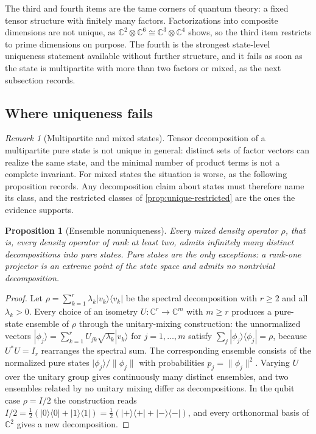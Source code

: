 \documentclass[11pt,letterpaper]{article}
\newtheorem{proposition}[theorem]{Proposition}
\theoremstyle{definition}
\theoremstyle{remark}
\newtheorem{remark}[theorem]{Remark}
\begin{document}
The third and fourth items are the tame corners of quantum theory: a fixed tensor structure with finitely many factors. Factorizations into composite dimensions are not unique, as $\mathbb{C}^2 \otimes \mathbb{C}^6 \cong \mathbb{C}^3 \otimes \mathbb{C}^4$ shows, so the third item restricts to prime dimensions on purpose. The fourth is the strongest state-level uniqueness statement available without further structure, and it fails as soon as the state is multipartite with more than two factors or mixed, as the next subsection records.

\subsection{Where uniqueness fails}

\begin{remark}[Multipartite and mixed states]
Tensor decomposition of a multipartite pure state is not unique in general: distinct sets of factor vectors can realize the same state, and the minimal number of product terms is not a complete invariant. For mixed states the situation is worse, as the following proposition records. Any decomposition claim about states must therefore name its class, and the restricted classes of \cref{prop:unique-restricted} are the ones the evidence supports.
\end{remark}

\begin{proposition}[Ensemble nonuniqueness]
\label{prop:ensemble}
Every mixed density operator $\rho$, that is, every density operator of rank at least two, admits infinitely many distinct decompositions into pure states. Pure states are the only exceptions: a rank-one projector is an extreme point of the state space and admits no nontrivial decomposition.
\end{proposition}

\begin{proof}
Let $\rho = \sum_{k=1}^{r} \lambda_k |v_k\rangle\langle v_k|$ be the spectral decomposition with $r \geq 2$ and all $\lambda_k > 0$. Every choice of an isometry $U \colon \mathbb{C}^{r} \to \mathbb{C}^{m}$ with $m \geq r$ produces a pure-state ensemble of $\rho$ through the unitary-mixing construction: the unnormalized vectors $|\phi_j\rangle = \sum_{k=1}^{r} U_{jk} \sqrt{\lambda_k} |v_k\rangle$ for $j = 1, \dots, m$ satisfy $\sum_j |\phi_j\rangle\langle\phi_j| = \rho$, because $U^* U = I_r$ rearranges the spectral sum. The corresponding ensemble consists of the normalized pure states $|\phi_j\rangle/\|\phi_j\|$ with probabilities $p_j = \|\phi_j\|^2$. Varying $U$ over the unitary group gives continuously many distinct ensembles, and two ensembles related by no unitary mixing differ as decompositions. In the qubit case $\rho = I/2$ the construction reads $I/2 = \frac{1}{2}(|0\rangle\langle 0| + |1\rangle\langle 1|) = \frac{1}{2}(|+\rangle\langle +| + |-\rangle\langle -|)$, and every orthonormal basis of $\mathbb{C}^2$ gives a new decomposition.
\end{proof}
\end{document}
